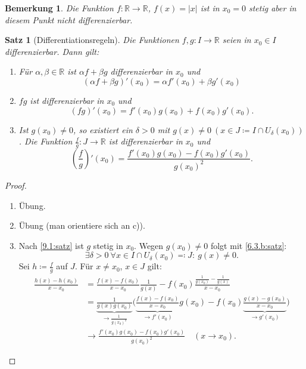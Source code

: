 \documentclass[12pt]{extreport} %
\newcommand{\R}{\mathbb{R}}
\theoremstyle{named}
\theoremstyle{itshape}
\newtheorem{satz}[unnamedtheorem]{Satz}
\theoremstyle{normal}
\newtheorem*{bemerkung}{Bemerkung}
\begin{document}
{\begin{bemerkung}
Die Funktion $f: \R \to \R$, $f(x)=|x|$ ist in $x_0=0$ stetig aber in diesem Punkt nicht differenzierbar.
\end{bemerkung}


\begin{satz}[Differentiationsregeln]
	Die Funktionen $f,g \colon I \rightarrow \R$ seien in  $x_{0} \in I$ differenzierbar. Dann gilt:
	\begin{enumerate}
		\item Für $\alpha, \beta \in \R$ ist $\alpha f + \beta g$ differenzierbar in $x_{0}$ und
			$$ (\alpha f + \beta g)'(x_{0}) = \alpha f'(x_{0}) + \beta g'(x_{0}) $$
		\item $f g$ ist differenzierbar in $x_{0}$ und
			$$ (f g)'(x_{0}) = f'(x_{0})g(x_{0})+ f(x_{0})g'(x_{0}). $$
		\item Ist $g(x_{0}) \neq 0$, so existiert ein $\delta > 0$ mit $g(x) \neq 0 ~(x \in J \coloneqq I \cap U_{\delta}(x_{0}))$. Die Funktion $\frac{f}{g} \colon J \rightarrow \R$ ist differenzierbar in $x_{0}$ und 
			$$ \left( \frac{f}{g} \right)'(x_{0}) = \frac{f'(x_{0}) g(x_{0}) - f(x_{0})g'(x_{0})}{g(x_{0})^{2}}. $$
	\end{enumerate}		
\end{satz}

\begin{proof} ~\
	\begin{enumerate}
		\item Übung.
		\item Übung (man orientiere sich an c)).
		\item Nach \ref{9.1:satz} ist $g$ stetig in $x_{0}$. Wegen $g(x_{0}) \neq 0$ folgt mit \ref{6.3.b:satz}:  
			$$ \exists \delta > 0 ~ \forall x \in I \cap U_{\delta}(x_{0}) \eqqcolon J: ~ g(x) \neq 0. $$
			Sei $h \coloneqq \frac{f}{g}$ auf $J$. Für $x \neq x_{0}$, $x \in J$ gilt:
			\begin{align*}
				\frac{h(x) - h(x_{0})}{x - x_{0}} & = \frac{f(x) - f(x_{0})}{x- x_{0}} \frac{1}{g(x)} - f(x_{0}) 
				\frac{\frac{1}{g(x_{0})} - \frac{1}{g(x)}}{x - x_{0}} \\
					& = \underbrace{\frac{1}{g(x)g(x_{0})}}_{\rightarrow \frac{1}{g(x_{0})^{2}}} 
					\bigg( \underbrace{\frac{f(x) - f(x_{0})}{x - x_{0}}}_{\rightarrow f'(x_{0})} g(x_{0}) - f(x_{0}) 
					\underbrace{\frac{g(x) - g(x_{0})}{x - x_{0}}}_{\rightarrow g'(x_{0})} \bigg) \\
					& \to \frac{f'(x_{0}) g(x_{0}) - f(x_{0})g'(x_{0})}{g(x_{0})^{2}} \quad (x \to x_0).
			\end{align*} 
	\end{enumerate}
\end{proof}


}
\end{document}
